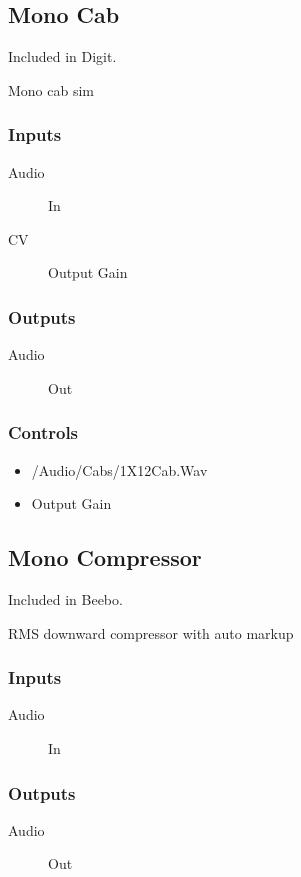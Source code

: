 \subsection{Mono Cab}

Included in Digit.

Mono cab sim



\subsubsection{Inputs}
\begin{description}
\item [Audio] In
\item [CV] Output Gain
\end{description}

\subsubsection{Outputs}
\begin{description}
\item [Audio] Out
\end{description}

\subsubsection{Controls}
\begin{itemize}
\item /Audio/Cabs/1X12Cab.Wav
\item Output Gain
\end{itemize}

\subsection{Mono Compressor}

Included in Beebo.

RMS downward compressor with auto markup



\subsubsection{Inputs}
\begin{description}
\item [Audio] In
\end{description}

\subsubsection{Outputs}
\begin{description}
\item [Audio] Out
\end{description}

